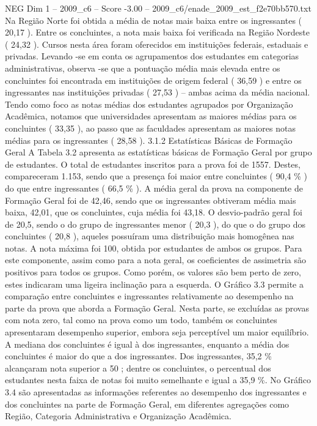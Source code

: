 \begin{textsample}{NEG Dim 1 – 2009\_c6 – Score -3.00 – 2009\_c6/enade\_2009\_est\_f2e70bb570.txt}
Na Região Norte foi obtida a média de notas mais baixa entre os ingressantes ( 20,17 ).
Entre os concluintes, a nota mais baixa foi verificada na Região Nordeste ( 24,32 ).
Cursos nesta área foram oferecidos em instituições federais, estaduais e privadas.
Levando -se em conta os agrupamentos dos estudantes em categorias administrativas, observa -se que a pontuação média mais elevada entre os concluintes foi encontrada em instituições de origem federal ( 36,59 ) e entre os ingressantes nas instituições privadas ( 27,53 ) – ambas acima da média nacional.
Tendo como foco as notas médias dos estudantes agrupados por Organização Acadêmica, notamos que universidades apresentam as maiores médias para os concluintes ( 33,35 ), ao passo que as faculdades apresentam as maiores notas médias para os ingressantes ( 28,58 ). 3.1.2 Estatísticas Básicas de Formação Geral A Tabela 3.2 apresenta as estatísticas básicas de Formação Geral por grupo de estudantes.
O total de estudantes inscritos para a prova foi de 1557.
Destes, compareceram 1.153, sendo que a presença foi maior entre concluintes ( 90,4 \% ) do que entre ingressantes ( 66,5 \% ).
A média geral da prova na componente de Formação Geral foi de 42,46, sendo que os ingressantes obtiveram média mais baixa, 42,01, que os concluintes, cuja média foi 43,18.
O desvio-padrão geral foi de 20,5, sendo o do grupo de ingressantes menor ( 20,3 ), do que o do grupo dos concluintes ( 20,8 ), aqueles possuíram uma distribuição mais homogênea nas notas.
A nota máxima foi 100, obtida por estudantes de ambos os grupos.
Para este componente, assim como para a nota geral, os coeficientes de assimetria são positivos para todos os grupos.
Como porém, os valores são bem perto de zero, estes indicaram uma ligeira inclinação para a esquerda.
O Gráfico 3.3 permite a comparação entre concluintes e ingressantes relativamente ao desempenho na parte da prova que aborda a Formação Geral.
Nesta parte, se excluídas as provas com nota zero, tal como na prova como um todo, também os concluintes apresentaram desempenho superior, embora seja perceptível um maior equilíbrio.
A mediana dos concluintes é igual à dos ingressantes, enquanto a média dos concluintes é maior do que a dos ingressantes.
Dos ingressantes, 35,2 \% alcançaram nota superior a 50 ; dentre os concluintes, o percentual dos estudantes nesta faixa de notas foi muito semelhante e igual a 35,9 \%.
No Gráfico 3.4 são apresentadas as informações referentes ao desempenho dos ingressantes e dos concluintes na parte de Formação Geral, em diferentes agregações como Região, Categoria Administrativa e Organização Acadêmica.

\end{textsample}
